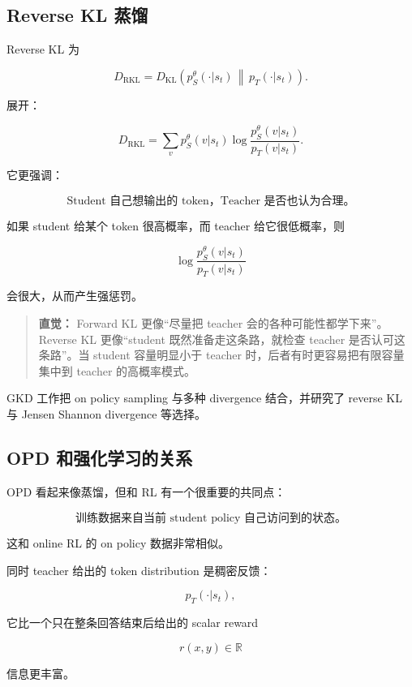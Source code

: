 \documentclass[11pt,a4paper]{ctexart}
\newcommand{\KL}[2]{D_{\mathrm{KL}}\!\left(#1\,\middle\|\,#2\right)}
\newenvironment{intuition}
{\begin{quote}\small\textbf{直觉：}}
{\end{quote}}
\begin{document}
\subsection{Reverse KL 蒸馏}

Reverse KL 为

\begin{equation}
D_{\mathrm{RKL}}
=
\KL{
p_S^\theta(\cdot|s_t)
}{
p_T(\cdot|s_t)
}.
\end{equation}

展开：

\begin{equation}
D_{\mathrm{RKL}}
=
\sum_v
p_S^\theta(v|s_t)
\log
\frac{
p_S^\theta(v|s_t)
}{
p_T(v|s_t)
}.
\end{equation}

它更强调：

\[
\text{Student 自己想输出的 token，Teacher 是否也认为合理。}
\]

如果 student 给某个 token 很高概率，而 teacher 给它很低概率，则

\[
\log
\frac{p_S^\theta(v|s_t)}{p_T(v|s_t)}
\]

会很大，从而产生强惩罚。

\begin{intuition}
Forward KL 更像“尽量把 teacher 会的各种可能性都学下来”。Reverse KL 更像“student 既然准备走这条路，就检查 teacher 是否认可这条路”。当 student 容量明显小于 teacher 时，后者有时更容易把有限容量集中到 teacher 的高概率模式。
\end{intuition}

GKD 工作把 on policy sampling 与多种 divergence 结合，并研究了 reverse KL 与 Jensen Shannon divergence 等选择。

\subsection{OPD 和强化学习的关系}

OPD 看起来像蒸馏，但和 RL 有一个很重要的共同点：

\[
\boxed{
\text{训练数据来自当前 student policy 自己访问到的状态。}
}
\]

这和 online RL 的 on policy 数据非常相似。

同时 teacher 给出的 token distribution 是稠密反馈：

\[
p_T(\cdot|s_t),
\]

它比一个只在整条回答结束后给出的 scalar reward

\[
r(x,y)\in\mathbb{R}
\]

信息更丰富。
\end{document}
